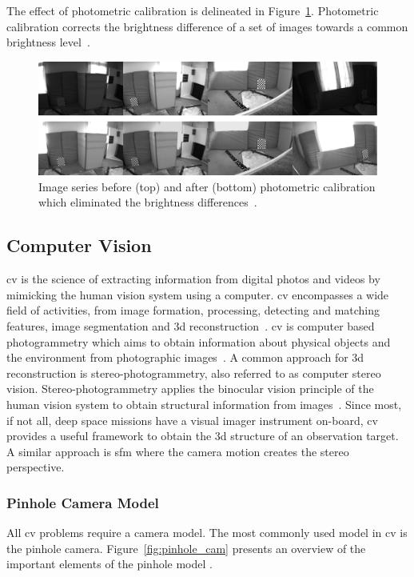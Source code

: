 The effect of photometric calibration is delineated in Figure~\ref{fig:t_photometry}. Photometric calibration corrects the brightness difference of a set of images towards a common brightness level~\cite{Bergmann2018OnlineSLAM}.
\begin{figure}[htb]
    \centering
    \includegraphics[width=\textwidth]{doc/thesis/0_figures/photo_calib.jpg}
    \caption{Image series before (top) and after (bottom) photometric calibration which eliminated the brightness differences~\cite{Bergmann2018OnlineSLAM}.}
    \label{fig:t_photometry}
\end{figure}

\subsection{Computer Vision} \label{sec:t_cv}
\Gls{cv} is the science of extracting information from digital photos and videos by mimicking the human vision system using a computer. \Gls{cv} encompasses a wide field of activities, from image formation, processing, detecting and matching features, image segmentation and \gls{3d} reconstruction~\cite{szeliski2010computer}. \Gls{cv} is computer based photogrammetry which aims to obtain information about physical objects and the environment from photographic images~\cite{Kasser2002DigitalPhotogrammetry}. A common approach for \gls{3d} reconstruction is stereo-photogrammetry, also referred to as computer stereo vision. Stereo-photogrammetry applies the binocular vision principle of the human vision system to obtain structural information from images~\cite{do2019review}. Since most, if not all, deep space missions have a visual imager instrument on-board, \gls{cv} provides a useful framework to obtain the \gls{3d} structure of an observation target. A similar approach is \gls{sfm} where the camera motion creates the stereo perspective.

\subsubsection{Pinhole Camera Model}
All \gls{cv} problems require a camera model. The most commonly used model in \gls{cv} is the pinhole camera. Figure~\ref{fig:pinhole_cam} presents an overview of the important elements of the pinhole model \cite{sturmCameraModel}.

